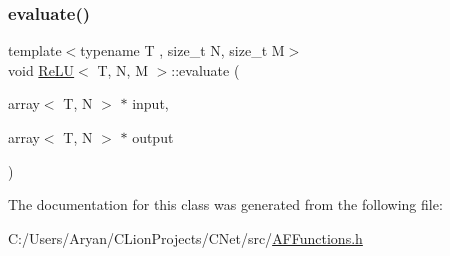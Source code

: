 \mbox{\label{class_re_l_u_a0e184c2046dcbe4c6af8805974f9b622}} 
\subsubsection{\texorpdfstring{evaluate()}{evaluate()}}
{\footnotesize\ttfamily template$<$typename T , size\+\_\+t N, size\+\_\+t M$>$ \\
void \hyperlink{class_re_l_u}{Re\+LU}$<$ T, N, M $>$\+::evaluate (\begin{DoxyParamCaption}\item[{array$<$ T, N $>$ $\ast$}]{input,  }\item[{array$<$ T, N $>$ $\ast$}]{output }\end{DoxyParamCaption})\hspace{0.3cm}{\ttfamily [inline]}}



The documentation for this class was generated from the following file\+:\begin{DoxyCompactItemize}
\item 
C\+:/\+Users/\+Aryan/\+C\+Lion\+Projects/\+C\+Net/src/\hyperlink{_a_f_functions_8h}{A\+F\+Functions.\+h}\end{DoxyCompactItemize}
